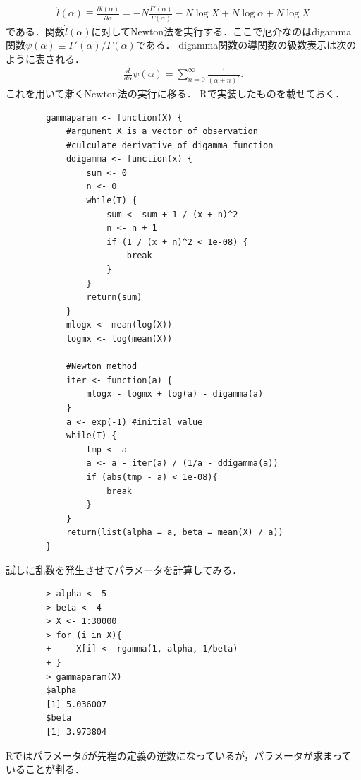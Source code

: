 \documentclass[a4j,papersize,disablejfam,slide,14pt]{jsarticle}
\def\Log#1{\operatorname{log} #1} %
\begin{document}
    \begin{align}
    	\dot{l}(\alpha) \equiv \frac{\partial l(\alpha)}{\partial \alpha} 
        = -N \frac{\Gamma'(\alpha)}{\Gamma(\alpha)} - N \Log{\overline{X}} + N \Log{\alpha} + N \overline{\Log{X}}
    \end{align}
    である．関数$\dot{l}(\alpha)$に対して{\rm Newton}法を実行する．ここで厄介なのは{\rm digamma}関数$\psi(\alpha) \equiv \Gamma'(\alpha)/\Gamma(\alpha)$である．
    {\rm digamma}関数の導関数の級数表示は次のように表される．
    \begin{align}
    	\frac{d}{d \alpha} \psi(\alpha) = \sum_{n=0}^{\infty} \frac{1}{(\alpha + n)^2}.
    \end{align}
    これを用いて漸く{\rm Newton}法の実行に移る．
    {\rm R}で実装したものを載せておく．
    \begin{lstlisting}
    	gammaparam <- function(X) {
        	#argument X is a vector of observation
        	#culculate derivative of digamma function
            ddigamma <- function(x) {
            	sum <- 0
                n <- 0
                while(T) {
                	sum <- sum + 1 / (x + n)^2
                    n <- n + 1
                    if (1 / (x + n)^2 < 1e-08) {
                    	break
                    }
                }
                return(sum)
            }
            mlogx <- mean(log(X))
            logmx <- log(mean(X))
            
            #Newton method
            iter <- function(a) {
            	mlogx - logmx + log(a) - digamma(a)
            }
            a <- exp(-1) #initial value
            while(T) {
            	tmp <- a
            	a <- a - iter(a) / (1/a - ddigamma(a))
                if (abs(tmp - a) < 1e-08){
                	break
                }
            }
            return(list(alpha = a, beta = mean(X) / a)) 
        }
    \end{lstlisting}
    試しに乱数を発生させてパラメータを計算してみる．
    \begin{lstlisting}
    	> alpha <- 5
		> beta <- 4
		> X <- 1:30000
		> for (i in X){
		+     X[i] <- rgamma(1, alpha, 1/beta)
		+ }
		> gammaparam(X)
		$alpha
		[1] 5.036007
        $beta
        [1] 3.973804
	\end{lstlisting}
    {\rm R}ではパラメータ$\beta$が先程の定義の逆数になっているが，パラメータが求まっていることが判る．
\end{document}
